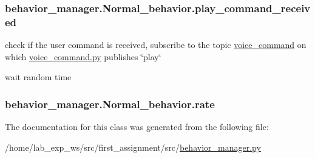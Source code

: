 \subsubsection[{\texorpdfstring{play\+\_\+command\+\_\+received}{play_command_received}}]{\setlength{\rightskip}{0pt plus 5cm}behavior\+\_\+manager.\+Normal\+\_\+behavior.\+play\+\_\+command\+\_\+received}\hypertarget{classbehavior__manager_1_1Normal__behavior_a023e0b91a5c02b8bce8cc771bba4ecfc}{}\label{classbehavior__manager_1_1Normal__behavior_a023e0b91a5c02b8bce8cc771bba4ecfc}


check if the user command is received, subscribe to the topic \hyperlink{namespacevoice__command}{voice\+\_\+command} on which \hyperlink{voice__command_8py}{voice\+\_\+command.\+py} publishes \char`\"{}play\char`\"{} 

wait random time 
\subsubsection[{\texorpdfstring{rate}{rate}}]{\setlength{\rightskip}{0pt plus 5cm}behavior\+\_\+manager.\+Normal\+\_\+behavior.\+rate}\hypertarget{classbehavior__manager_1_1Normal__behavior_a8c0881c34370caec4f5298f0ebe35489}{}\label{classbehavior__manager_1_1Normal__behavior_a8c0881c34370caec4f5298f0ebe35489}


The documentation for this class was generated from the following file\+:\begin{DoxyCompactItemize}
\item 
/home/lab\+\_\+exp\+\_\+ws/src/first\+\_\+assignment/src/\hyperlink{behavior__manager_8py}{behavior\+\_\+manager.\+py}\end{DoxyCompactItemize}
